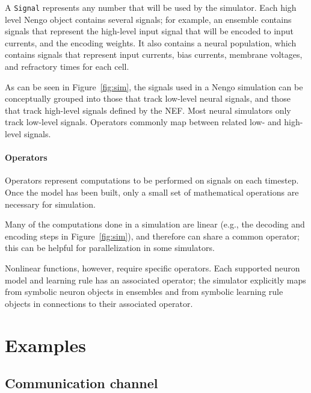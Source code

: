 \documentclass{frontiersSCNS}
\begin{document}
A \texttt{Signal} represents any number that
will be used by the simulator.
Each high level Nengo object contains
several signals;
for example, an ensemble contains signals
that represent the high-level input
signal that will be encoded
to input currents,
and the encoding weights.
It also contains a neural population,
which contains signals that represent
input currents, bias currents,
membrane voltages, and refractory times for each cell.

As can be seen in Figure~\ref{fig:sim},
the signals used in a Nengo simulation
can be conceptually grouped into
those that track low-level neural signals,
and those that track high-level signals
defined by the NEF.
Most neural simulators only track
low-level signals.
Operators commonly map
between related low- and high-level signals.

\paragraph{Operators}

Operators represent computations
to be performed on signals on each timestep.
Once the model has been built,
only a small set of mathematical
operations are necessary for simulation.

Many of the computations
done in a simulation
are linear (e.g.,
the decoding and encoding steps
in Figure~\ref{fig:sim}),
and therefore can share a common operator;
this can be helpful for parallelization
in some simulators.

Nonlinear functions, however,
require specific operators.
Each supported neuron model and learning rule
has an associated operator;
the simulator explicitly maps
from symbolic neuron objects in ensembles
and from symbolic learning rule objects
in connections to their associated operator.

\section{Examples} \label{sec:examples}

\subsection{Communication channel} \label{sec:comm-channel}
\end{document}
